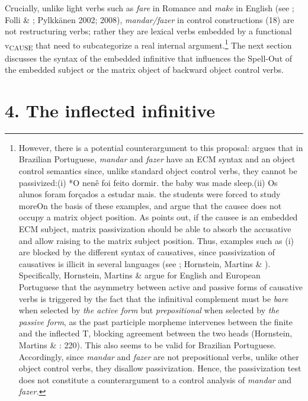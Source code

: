 \documentclass[output=paper]{langsci/langscibook}
\begin{document}
Crucially, unlike light verbs such as \textit{fare} in Romance and \textit{make} in English (see \citealt{Guasti1996}; Folli \& \citealt{Harley2007}; Pylkkänen 2002; 2008), \textit{mandar/fazer} in control constructions (18) are not restructuring verbs; rather they are lexical verbs embedded by a functional v\textsubscript{CAUSE}  that need to subcategorize a real internal argument.\footnote{However, there is a potential counterargument to this proposal: \citet{Farrell1995} argues that in Brazilian Portuguese, \textit{mandar} and \textit{fazer} have an ECM syntax and an object control semantics since, unlike standard object control verbs, they cannot be passivized:(i)  *O nenê   foi feito    dormir.  the baby  was made  sleep.(ii)  Os alunos    foram forçados  a  estudar  mais.  the students were  forced      to study  moreOn the basis of these examples, \citet{Farrell1995} and \citet{Hornstein2003} argue that the causee does not occupy a matrix object position. As \citet{Landau2004} points out, if the causee is an embedded ECM subject, matrix passivization should be able to absorb the accusative and allow raising to the matrix subject position.   Thus, examples such as (i) are blocked by the different syntax of causatives, since passivization of causatives is illicit in several languages (see \citealt{Landau2004}; Hornstein, Martins \& \citealt{Nunes2008}). Specifically, Hornstein, Martins \& \citet{Nunes2008} argue for English and European Portuguese that the asymmetry between active and passive forms of causative verbs is triggered by the fact that the infinitival complement must be \textit{bare} when selected by \textit{the active form} but \textit{prepositional} when selected by \textit{the passive form}, as the past participle morpheme intervenes between the finite and the inflected T, blocking agreement between the two heads (Hornstein, Martins \& \citealt{Nunes2008}: 220).  This also seems to be valid for Brazilian Portuguese. Accordingly, since \textit{mandar} and \textit{fazer} are not prepositional verbs, unlike other object control verbs, they disallow passivization. Hence, the passivization test does not constitute a counterargument to a control analysis of \textit{mandar} and \textit{fazer.}} The next section discusses the syntax of the embedded infinitive that influences the Spell-Out of the embedded subject or the matrix object of backward object control verbs. 

\section{ 4. The inflected infinitive}
\end{document}
